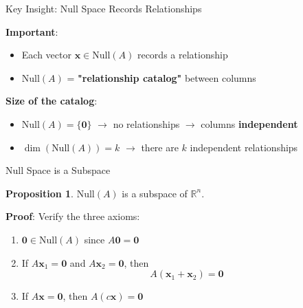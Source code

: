 \documentclass[10pt]{beamer}
\theoremstyle{definition}
\newtheorem{prop}{Proposition}[section]
\newcommand{\x}[1]{\alert{\textbf{#1}}}
\begin{document}
\begin{frame}{Key Insight: Null Space Records Relationships}

\x{Important}:

\begin{itemize}
\item Each vector $\mathbf{x} \in \text{Null}(A)$ records a relationship
\item $\text{Null}(A)$ = \textbf{"relationship catalog"} between columns
\end{itemize}

\vspace{1em}

\x{Size of the catalog}:
\begin{itemize}
\item $\text{Null}(A) = \{\mathbf{0}\}$ $\to$ no relationships $\to$ columns \textbf{independent}
\item $\dim(\text{Null}(A)) = k$ $\to$ there are $k$ independent relationships
\end{itemize}

\end{frame}

\begin{frame}{Null Space is a Subspace}

\begin{prop}
$\text{Null}(A)$ is a subspace of $\mathbb{R}^n$.
\end{prop}

\vspace{0.5em}

\textbf{Proof}: Verify the three axioms:

\begin{enumerate}
\item $\mathbf{0} \in \text{Null}(A)$ since $A\mathbf{0} = \mathbf{0}$ \checkmark
\item If $A\mathbf{x}_1 = \mathbf{0}$ and $A\mathbf{x}_2 = \mathbf{0}$, then
$$A(\mathbf{x}_1 + \mathbf{x}_2) = \mathbf{0}$$ \checkmark
\item If $A\mathbf{x} = \mathbf{0}$, then $A(c\mathbf{x}) = \mathbf{0}$ \checkmark
\end{enumerate}

\end{frame}
\end{document}
